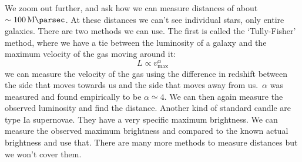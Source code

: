 We zoom out further, and ask how we can measure distances of about \(\sim\qty{100}{\mega\parsec}\). At these distances we can't see individual stars, only entire galaxies. There are two methods we can use. The first is called the `Tully-Fisher' method, where we have a tie between the luminosity of a galaxy and the maximum velocity of the gas moving around it:
\begin{equation}
  L \propto v_{\max}^\alpha
\end{equation}
we can measure the velocity of the gas using the difference in redshift between the side that moves towards us and the side that moves away from us.\ \(\alpha \) was measured and found empirically to be \(\alpha \simeq 4\). We can then again measure the observed luminosity and find the distance. Another kind of standard candle are type Ia supernovae. They have a very specific maximum brightness. We can measure the observed maximum brightness and compared to the known actual brightness and use that. There are many more methods to measure distances but we won't cover them.

